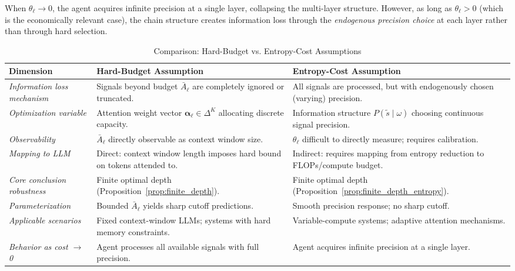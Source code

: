 When $\theta_\ell \to 0$, the agent acquires infinite precision at a single layer, collapsing the multi-layer structure. However, as long as $\theta_\ell > 0$ (which is the economically relevant case), the chain structure creates information loss through the \emph{endogenous precision choice} at each layer rather than through hard selection.

\begin{table}[htbp]
\centering
\caption{Comparison: Hard-Budget vs. Entropy-Cost Assumptions}
\label{tab:assumption_comparison}
\begin{tabular}{@{}p{3.2cm}p{5.5cm}p{5.5cm}@{}}
\toprule
\textbf{Dimension} & \textbf{Hard-Budget Assumption} & \textbf{Entropy-Cost Assumption} \\
\midrule
\textit{Information loss mechanism} & 
Signals beyond budget $\bar{A}_\ell$ are completely ignored or truncated. & 
All signals are processed, but with endogenously chosen (varying) precision. \\
\addlinespace
\textit{Optimization variable} & 
Attention weight vector $\boldsymbol{\alpha}_\ell \in \Delta^{K}$ allocating discrete capacity. & 
Information structure $P(\tilde{s} \mid \omega)$ choosing continuous signal precision. \\
\addlinespace
\textit{Observability} & 
$\bar{A}_\ell$ directly observable as context window size. & 
$\theta_\ell$ difficult to directly measure; requires calibration. \\
\addlinespace
\textit{Mapping to LLM} & 
Direct: context window length imposes hard bound on tokens attended to. & 
Indirect: requires mapping from entropy reduction to FLOPs/compute budget. \\
\addlinespace
\textit{Core conclusion robustness} & 
Finite optimal depth (Proposition~\ref{prop:finite_depth}). & 
Finite optimal depth (Proposition~\ref{prop:finite_depth_entropy}). \\
\addlinespace
\textit{Parameterization} & 
Bounded $\bar{A}_\ell$ yields sharp cutoff predictions. & 
Smooth precision response; no sharp cutoff. \\
\addlinespace
\textit{Applicable scenarios} & 
Fixed context-window LLMs; systems with hard memory constraints. & 
Variable-compute systems; adaptive attention mechanisms. \\
\addlinespace
\textit{Behavior as cost $\to$ 0} & 
Agent processes all available signals with full precision. & 
Agent acquires infinite precision at a single layer. \\
\bottomrule
\end{tabular}
\end{table}

